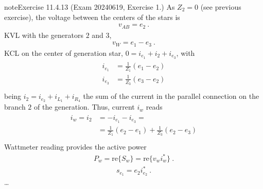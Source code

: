 \documentclass[letterpaper,10pt,english]{jupyterBook}
\begin{document}
\begin{sphinxadmonition}{note}{Exercise 11.4.13 (Exam 2024\sphinxhyphen{}06\sphinxhyphen{}19, Exercise 1.)}
\sphinxAtStartPar
{} As \(Z_2 = 0\) (see previous exercise), the voltage between the centers of the stars is
\begin{equation*}
\begin{split}v_{AB} = e_2 \ .\end{split}
\end{equation*}
\sphinxAtStartPar
{} KVL with the generators \(2\) and \(3\),
\begin{equation*}
\begin{split}v_W = e_1 - e_3 \ .\end{split}
\end{equation*}
\sphinxAtStartPar
{} KCL on the center of generation star, \(0 = i_{e_1} + i_{2} + i_{e_3}\), with
\begin{equation*}
\begin{split}\begin{aligned}
  i_{e_1} & =  \frac{1}{Z_1} ( e_1 - e_2 ) \\
  i_{e_3} & =  \frac{1}{Z_3} ( e_3 - e_2 ) \\
\end{aligned}\end{split}
\end{equation*}
\sphinxAtStartPar
being \(i_2 = i_{e_2} + i_{L_1} + i_{R_4}\) the sum of the current in the parallel connection on the branch \(2\) of the generation. Thus, current \(i_{w}\) reads
\begin{equation*}
\begin{split}\begin{aligned}
  i_w = i_{2} 
  & = - i_{e_1} - i_{e_3} = \\
  & = \frac{1}{Z_1} ( e_2 - e_1 ) + \frac{1}{Z_3} ( e_2 - e_3 ) \\
\end{aligned}\end{split}
\end{equation*}
\sphinxAtStartPar
{} Wattmeter reading provides the active power
\begin{equation*}
\begin{split}P_w = \text{re} \{ S_w \} = \text{re} \{ v_w i_w^* \} \ .\end{split}
\end{equation*}
\sphinxAtStartPar
{}
\begin{equation*}
\begin{split}s_{e_1} = e_{2} i_{e_2}^* \ .\end{split}
\end{equation*}
\sphinxAtStartPar
…
\end{sphinxadmonition}
 \label{exercise:exam-24-02-13-exe-02}
\end{document}
